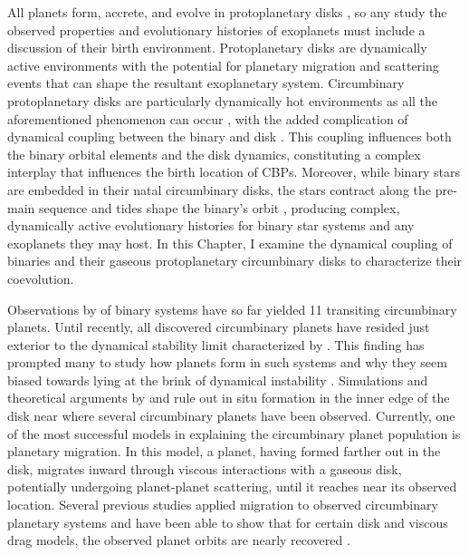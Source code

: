 All planets form, accrete, and evolve in protoplanetary disks \citep[e.g.][]{Lin1996,Nelson2000,Papaloizou2006,Rogers2011,Bodenheimer2014}, so any study the observed properties and evolutionary histories of exoplanets must include a discussion of their birth environment.  Protoplanetary disks are dynamically active environments with the potential for planetary migration and scattering events that can shape the resultant exoplanetary system.  Circumbinary protoplanetary disks are particularly dynamically hot environments as all the aforementioned phenomenon can occur \citep[e.g.][]{Pierens2013}, with the added complication of dynamical coupling between the binary and disk \citep{Papaloizou2001}.  This coupling influences both the binary orbital elements and the disk dynamics, constituting a complex interplay that influences the birth location of CBPs.  Moreover, while binary stars are embedded in their natal circumbinary disks, the stars contract along the pre-main sequence \citep{Baraffe2015} and tides shape the binary's orbit \citep{Zahn1989}, producing complex, dynamically active evolutionary histories for binary star systems and any exoplanets they may host.  In this Chapter, I examine the dynamical coupling of binaries and their gaseous protoplanetary circumbinary disks to characterize their coevolution.

Observations by \kepler of binary systems have so far yielded 11 transiting circumbinary planets.  Until recently, all discovered circumbinary planets have resided just exterior to the dynamical stability limit characterized by \citet{Dvorak1986,Holman1999}.  This
finding has prompted many to study how planets form in such systems and why they seem biased towards lying at the brink of dynamical instability \citep{Welsh2014,Pierens2013}.  Simulations and theoretical arguments by \citet{Pelupessy2013} and \citet{Bromley2015} rule out in situ formation
in the inner edge of the disk near where several circumbinary planets have been observed.  Currently, one of the most successful models in explaining the circumbinary planet population is planetary migration.  
In this model, a planet, having formed farther out in the disk, migrates inward through viscous interactions with a gaseous disk, potentially undergoing planet-planet scattering, until it reaches near its observed location.  Several previous studies applied migration to observed circumbinary planetary systems and have been able to show that for certain disk and viscous drag models, the observed planet orbits are nearly recovered \citep[e.g.][]{Kley2014,Kley2015,Pierens2007,Pierens2013}.

